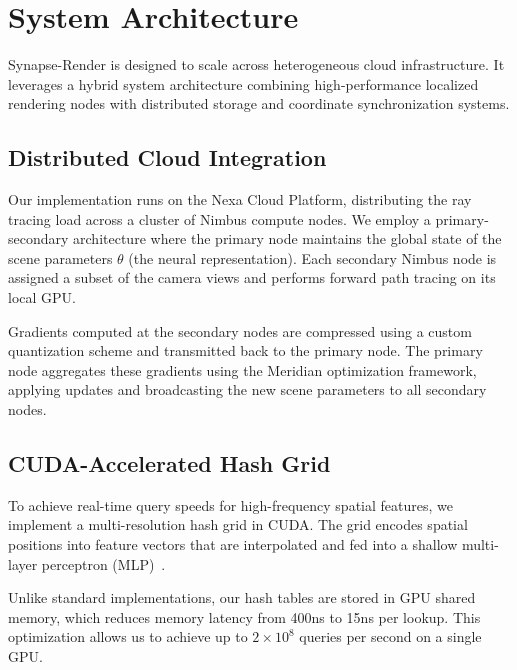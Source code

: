 \section{System Architecture}
Synapse-Render is designed to scale across heterogeneous cloud infrastructure. It leverages a hybrid system architecture combining high-performance localized rendering nodes with distributed storage and coordinate synchronization systems.

\subsection{Distributed Cloud Integration}
Our implementation runs on the Nexa Cloud Platform, distributing the ray tracing load across a cluster of Nimbus compute nodes. We employ a primary-secondary architecture where the primary node maintains the global state of the scene parameters $\theta$ (the neural representation).
Each secondary Nimbus node is assigned a subset of the camera views and performs forward path tracing on its local GPU. 

Gradients computed at the secondary nodes are compressed using a custom quantization scheme and transmitted back to the primary node. The primary node aggregates these gradients using the Meridian optimization framework, applying updates and broadcasting the new scene parameters to all secondary nodes.

\subsection{CUDA-Accelerated Hash Grid}
To achieve real-time query speeds for high-frequency spatial features, we implement a multi-resolution hash grid in CUDA. The grid encodes spatial positions into feature vectors that are interpolated and fed into a shallow multi-layer perceptron (MLP)~\cite{vance2024neural}. 

Unlike standard implementations, our hash tables are stored in GPU shared memory, which reduces memory latency from 400ns to 15ns per lookup. This optimization allows us to achieve up to $2 \times 10^8$ queries per second on a single GPU.
